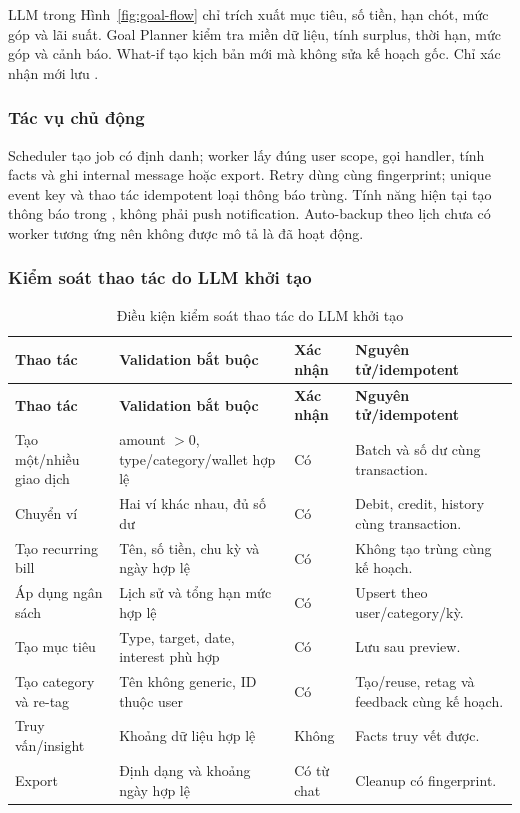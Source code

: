 
LLM trong Hình~\ref{fig:goal-flow} chỉ trích xuất mục tiêu, số tiền, hạn chót, mức góp và lãi suất. Goal Planner kiểm tra miền dữ liệu, tính surplus, thời hạn, mức góp và cảnh báo. What-if tạo kịch bản mới mà không sửa kế hoạch gốc. Chỉ xác nhận mới lưu .

\subsubsection{Tác vụ chủ động}


Scheduler tạo job có định danh; worker lấy đúng user scope, gọi handler, tính facts và ghi internal message hoặc export. Retry dùng cùng fingerprint; unique event key và thao tác idempotent loại thông báo trùng. Tính năng hiện tại tạo thông báo trong , không phải push notification. Auto-backup theo lịch chưa có worker tương ứng nên không được mô tả là đã hoạt động.

\subsubsection{Kiểm soát thao tác do LLM khởi tạo}

\begin{longtable}{@{}L{3.0cm}L{5.0cm}L{1.5cm}L{3.2cm}@{}}
  \caption{Điều kiện kiểm soát thao tác do LLM khởi tạo}\label{tab:llm-actions}\\
  \toprule
  \textbf{Thao tác} & \textbf{Validation bắt buộc} & \textbf{Xác nhận} & \textbf{Nguyên tử/idempotent} \\
  \midrule
  \endfirsthead
  \toprule
  \textbf{Thao tác} & \textbf{Validation bắt buộc} & \textbf{Xác nhận} & \textbf{Nguyên tử/idempotent} \\
  \midrule
  \endhead
  Tạo một/nhiều giao dịch & amount $>0$, type/category/wallet hợp lệ & Có & Batch và số dư cùng transaction. \\
  Chuyển ví & Hai ví khác nhau, đủ số dư & Có & Debit, credit, history cùng transaction. \\
  Tạo recurring bill & Tên, số tiền, chu kỳ và ngày hợp lệ & Có & Không tạo trùng cùng kế hoạch. \\
  Áp dụng ngân sách & Lịch sử và tổng hạn mức hợp lệ & Có & Upsert theo user/category/kỳ. \\
  Tạo mục tiêu & Type, target, date, interest phù hợp & Có & Lưu sau preview. \\
  Tạo category và re-tag & Tên không generic, ID thuộc user & Có & Tạo/reuse, retag và feedback cùng kế hoạch. \\
  Truy vấn/insight & Khoảng dữ liệu hợp lệ & Không & Facts truy vết được. \\
  Export & Định dạng và khoảng ngày hợp lệ & Có từ chat & Cleanup có fingerprint. \\
  \bottomrule
\end{longtable}

